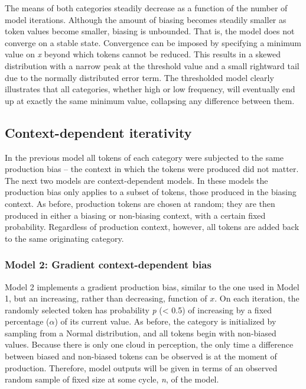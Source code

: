 The means of both categories steadily decrease as a function of the
number of model iterations. Although the amount of biasing becomes
steadily smaller as token values become smaller, biasing is unbounded.
That is, the model does not converge on a stable state. Convergence
can be imposed by specifying a minimum value on \emph{x} beyond which
tokens cannot be reduced. This results in a skewed distribution with
a narrow peak at the threshold value and a small rightward tail due
to the normally distributed error term. The thresholded model clearly
illustrates that all categories, whether high or low frequency, will
eventually end up at exactly the same minimum value, collapsing any
difference between them. 

\subsection{\label{sec:Context-Dependent-Iterativity}Context-dependent iterativity}

In the previous model all tokens of each category were subjected to
the same production bias – the context in which the tokens were produced
did not matter. The next two models are context-dependent models.
In these models the production bias only applies to a subset of tokens,
those produced in the biasing context. As before, production tokens
are chosen at random; they are then produced in either a biasing or
non-biasing context, with a certain fixed probability. Regardless
of production context, however, all tokens are added back to the same
originating category.

\subsubsection{\label{subsec:Phrase-Final Lengthening}Model 2: Gradient context-dependent bias}

Model 2 implements a gradient production bias, similar to the one
used in Model 1, but an increasing, rather than decreasing, function
of $x$. On each iteration, the randomly selected token has probability
\emph{p} (< 0.5) of increasing by a fixed percentage ($\alpha$) of
its current value. As before, the category is initialized by sampling
from a Normal distribution, and all tokens begin with non-biased values.
Because there is only one cloud in perception, the only time a difference
between biased and non-biased tokens can be observed is at the moment
of production. Therefore, model outputs will be given in terms of
an observed random sample of fixed size at some cycle, \emph{n}, of
the model.

